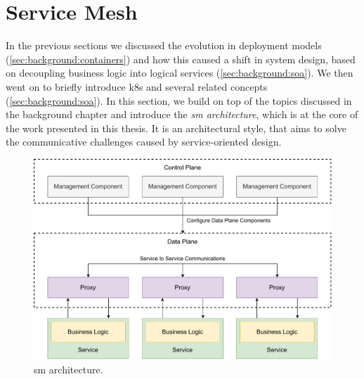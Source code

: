 \section{Service Mesh}
\label{sec:background:service-mesh}

In the previous sections we discussed the evolution in deployment models (\cref{sec:background:containers}) and how this caused a shift in system design, based on decoupling business logic into logical services (\cref{sec:background:soa}). We then went on to briefly introduce \gls{k8s} and several related concepts (\cref{sec:background:soa}). In this section, we build on top of the topics discussed in the background chapter and introduce the \textit{\gls{sm} architecture}, which is at the core of the work presented in this thesis. It is an architectural style, that aims to solve the communicative challenges caused by service-oriented design.



\begin{figure}[!t]
    \centering
    
    \includegraphics[width=\linewidth]{2_background/figures/service-mesh-architecture.pdf}

    \caption[Service Mesh Architecture]{\Gls{sm} architecture.}
    \label{fig:service-mesh-architecture}
\end{figure}

